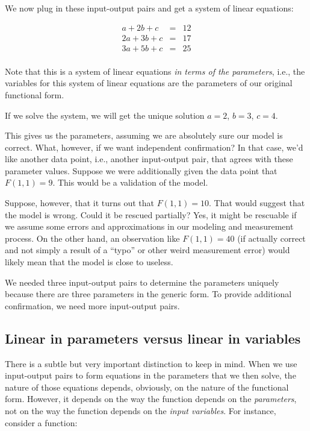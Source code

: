 \documentclass[10pt]{amsart}
\begin{document}
We now plug in these input-output pairs and get a system of linear
equations:

\begin{eqnarray*}
  a + 2b + c  & = & 12\\
  2a + 3b + c & = & 17\\
  3a + 5b + c & = & 25\\
\end{eqnarray*}

Note that this is a system of linear equations {\em in terms of the
  parameters}, i.e., the variables for this system of linear equations
are the parameters of our original functional form.

If we solve the system, we will get the unique solution $a = 2$, $b =
3$, $c = 4$.

This gives us the parameters, assuming we are absolutely sure our
model is correct. What, however, if we want independent confirmation?
In that case, we'd like another data point, i.e., another input-output
pair, that agrees with these parameter values. Suppose we were
additionally given the data point that $F(1,1) = 9$. This would be a
validation of the model.

Suppose, however, that it turns out that $F(1,1) = 10$. That would
suggest that the model is wrong. Could it be rescued partially? Yes,
it might be rescuable if we assume some errors and approximations in
our modeling and measurement process. On the other hand, an
observation like $F(1,1) = 40$ (if actually correct and not simply a
result of a ``typo'' or other weird measurement error) would likely
mean that the model is close to useless.

We needed three input-output pairs to determine the parameters
uniquely because there are three parameters in the generic form. To
provide additional confirmation, we need more input-output pairs.

\subsection{Linear in parameters versus linear in variables}

There is a subtle but very important distinction to keep in mind. When
we use input-output pairs to form equations in the parameters that we
then solve, the nature of those equations depends, obviously, on the
nature of the functional form. However, it depends on the way the
function depends on the {\em parameters}, not on the way the function
depends on the {\em input variables}. For instance, consider a function:
\end{document}
